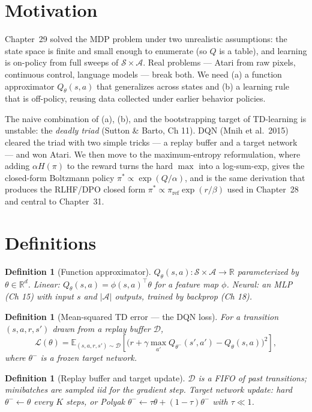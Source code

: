 \documentclass[11pt]{article}
\newtheorem{definition}[theorem]{Definition}
\theoremstyle{remark}
\begin{document}
\section*{Motivation}

Chapter~29 solved the MDP problem under two unrealistic assumptions: the state space is finite and small enough to enumerate (so $Q$ is a table), and learning is on-policy from full sweeps of $\mathcal{S}\times\mathcal{A}$. Real problems --- Atari from raw pixels, continuous control, language models --- break both. We need (a) a function approximator $Q_\theta(s,a)$ that generalizes across states and (b) a learning rule that is off-policy, reusing data collected under earlier behavior policies.

The naive combination of (a), (b), and the bootstrapping target of TD-learning is unstable: the \emph{deadly triad} (Sutton \& Barto, Ch 11). DQN (Mnih et al.\ 2015) cleared the triad with two simple tricks --- a replay buffer and a target network --- and won Atari. We then move to the maximum-entropy reformulation, where adding $\alpha H(\pi)$ to the reward turns the hard $\max$ into a log-sum-exp, gives the closed-form Boltzmann policy $\pi^* \propto \exp(Q/\alpha)$, and is the same derivation that produces the RLHF/DPO closed form $\pi^*\propto\pi_{\mathrm{ref}}\exp(r/\beta)$ used in Chapter~28 and central to Chapter~31.

\section*{Definitions}

\begin{definition}[Function approximator]
$Q_\theta(s,a):\mathcal{S}\times\mathcal{A}\to\mathbb{R}$ parameterized by $\theta\in\mathbb{R}^d$. Linear: $Q_\theta(s,a)=\phi(s,a)^\top\theta$ for a feature map $\phi$. Neural: an MLP (Ch 15) with input $s$ and $|\mathcal{A}|$ outputs, trained by backprop (Ch 18).
\end{definition}

\begin{definition}[Mean-squared TD error --- the DQN loss]
For a transition $(s,a,r,s')$ drawn from a replay buffer $\mathcal{D}$,
\[
\mathcal{L}(\theta)=\mathbb{E}_{(s,a,r,s')\sim\mathcal{D}}\!\left[\big(r+\gamma\max_{a'}Q_{\theta^-}(s',a')-Q_\theta(s,a)\big)^2\right],
\]
where $\theta^-$ is a frozen \emph{target network}.
\end{definition}

\begin{definition}[Replay buffer and target update]
$\mathcal{D}$ is a FIFO of past transitions; minibatches are sampled iid for the gradient step. Target network update: \emph{hard} $\theta^-\leftarrow\theta$ every $K$ steps, or \emph{Polyak} $\theta^-\leftarrow\tau\theta+(1-\tau)\theta^-$ with $\tau\ll 1$.
\end{definition}
\end{document}
